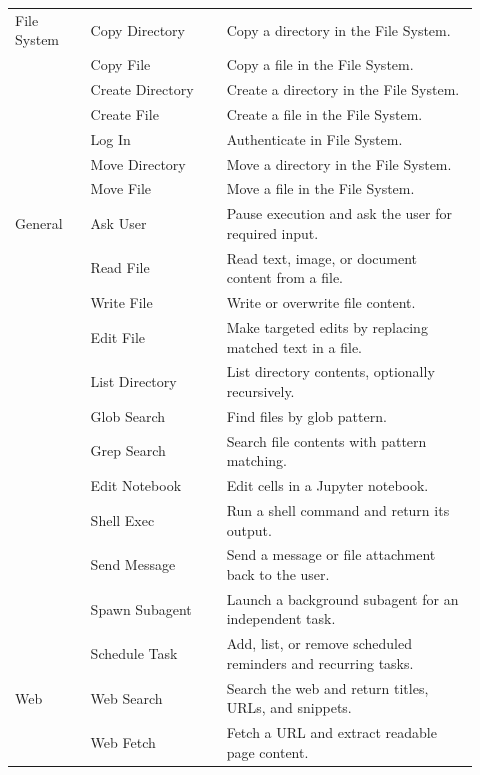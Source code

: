 \documentclass{llmxive}
\begin{document}
\begin{longtable}{@{}p{0.15\linewidth}p{0.27\linewidth}p{0.50\linewidth}@{}}
\midrule
File System & Copy Directory & Copy a directory in the File System. \\
 & Copy File & Copy a file in the File System. \\
 & Create Directory & Create a directory in the File System. \\
 & Create File & Create a file in the File System. \\
 & Log In & Authenticate in File System. \\
 & Move Directory & Move a directory in the File System. \\
 & Move File & Move a file in the File System. \\
\midrule
General & Ask User & Pause execution and ask the user for required input. \\
 & Read File & Read text, image, or document content from a file. \\
 & Write File & Write or overwrite file content. \\
 & Edit File & Make targeted edits by replacing matched text in a file. \\
 & List Directory & List directory contents, optionally recursively. \\
 & Glob Search & Find files by glob pattern. \\
 & Grep Search & Search file contents with pattern matching. \\
 & Edit Notebook & Edit cells in a Jupyter notebook. \\
 & Shell Exec & Run a shell command and return its output. \\
 & Send Message & Send a message or file attachment back to the user. \\
 & Spawn Subagent & Launch a background subagent for an independent task. \\
 & Schedule Task & Add, list, or remove scheduled reminders and recurring tasks. \\
\midrule
Web & Web Search & Search the web and return titles, URLs, and snippets. \\
 & Web Fetch & Fetch a URL and extract readable page content. \\

\end{longtable}
\endgroup

\flushbottom
\end{document}
